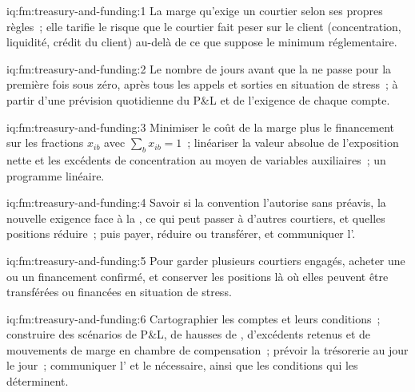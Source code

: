 \begin{solution}{iq:fm:treasury-and-funding:1}
La marge qu'exige un courtier selon ses propres règles~; elle tarifie le risque que le courtier fait peser sur le client (concentration, liquidité, crédit du client) au-delà
de ce que suppose le minimum réglementaire.
\end{solution}

\begin{solution}{iq:fm:treasury-and-funding:2}
Le nombre de jours avant que la  ne passe pour la première fois sous zéro, après tous les appels et sorties en situation de stress~; à partir d'une prévision quotidienne du P\&L et
de l'exigence de chaque compte.
\end{solution}

\begin{solution}{iq:fm:treasury-and-funding:3}
Minimiser le coût de la marge plus le financement sur les fractions $x_{ib}$ avec $\sum_bx_{ib}=1$~; linéariser la valeur absolue de l'exposition nette et les excédents de concentration
au moyen de variables auxiliaires~; un programme linéaire.
\end{solution}

\begin{solution}{iq:fm:treasury-and-funding:4}
Savoir si la convention l'autorise sans préavis, la nouvelle exigence face à la , ce qui peut passer à d'autres courtiers, et quelles positions
réduire~; puis payer, réduire ou transférer, et communiquer l'.
\end{solution}

\begin{solution}{iq:fm:treasury-and-funding:5}
Pour garder plusieurs courtiers engagés, acheter une  ou un financement confirmé, et conserver les positions là où elles peuvent être transférées ou financées en situation de stress.
\end{solution}

\begin{solution}{iq:fm:treasury-and-funding:6}
Cartographier les comptes et leurs conditions~; construire des scénarios de P\&L, de hausses de , d'excédents retenus et de mouvements de marge en chambre de compensation~; prévoir la trésorerie au jour le jour~;
communiquer l' et le  nécessaire, ainsi que les conditions qui les déterminent.
\end{solution}
